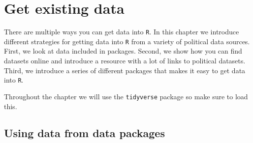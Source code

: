 \documentclass[12pt,oneside]{reedthesis}
\theoremstyle{definition}
\theoremstyle{definition}
\theoremstyle{definition}
\theoremstyle{remark}
\begin{document}
  \chapter{Get existing data}\label{datadownload}
  
  There are multiple ways you can get data into \texttt{R}. In this
  chapter we introduce different strategies for getting data into
  \texttt{R} from a variety of political data sources. First, we look at
  data included in packages. Second, we show how you can find datasets
  online and introduce a resource with a lot of links to political
  datasets. Third, we introduce a series of different packages that makes
  it easy to get data into \texttt{R}.
  
  Throughout the chapter we will use the \texttt{tidyverse} package so
  make sure to load this.
  \begin{Shaded}
  \begin{Highlighting}[]
  \NormalTok{(}\NormalTok{)}
  \end{Highlighting}
  \end{Shaded}
  \section{Using data from data
  packages}\label{using-data-from-data-packages}
  
\end{document}
